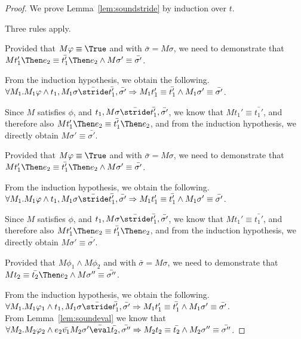 \begin{proof}
  We prove Lemma~\ref{lem:soundstride} by induction over $t$.

  {
  Three rules apply.\\
    {Provided that $M\phi\equiv\True$ and  with $\bar{\sigma}=M\sigma$,
    we need to demonstrate that $M t_1'\Then e_2 \equiv \bar{t_1'}\Then e_2 \land M\sigma'\equiv \bar{\sigma'}$.

    From the induction hypothesis, we obtain the following.\\
    $\forall M_1 . M_1 \phi \land t_1,M_1\sigma \bar{\stride} \bar{t_1'},\bar{\sigma'}\implies M_1 t_1'\equiv\bar{t_1'}\land M_1\sigma' \equiv \bar{\sigma'}$.

    Since $M$ satisfies $\phi$, and $t_1,M\sigma \bar{\stride} \bar{t_1'},\bar{\sigma'}$,
    we know that $M t_1'\equiv\bar{t_1'}$,
    and therefore also $M t_1'\Then e_2 \equiv \bar{t_1'}\Then e_2$,
    and from the induction hypothesis, we directly obtain  $M\sigma'\equiv \bar{\sigma'}$.
    }
    {Provided that $M\phi\equiv\True$ and  with $\bar{\sigma}=M\sigma$,
    we need to demonstrate that $M t_1'\Then e_2 \equiv \bar{t_1'}\Then e_2 \land M\sigma'\equiv \bar{\sigma'}$.

    From the induction hypothesis, we obtain the following.\\
    $\forall M_1 . M_1 \phi \land t_1,M_1\sigma \bar{\stride} \bar{t_1'},\bar{\sigma'}\implies M_1 t_1'\equiv\bar{t_1'}\land M_1\sigma' \equiv \bar{\sigma'}$.

    Since $M$ satisfies $\phi$, and $t_1,M\sigma \bar{\stride} \bar{t_1'},\bar{\sigma'}$,
    we know that $M t_1'\equiv\bar{t_1'}$,
    and therefore also $M t_1'\Then e_2 \equiv \bar{t_1'}\Then e_2$,
    and from the induction hypothesis, we directly obtain  $M\sigma'\equiv \bar{\sigma'}$.
    }
    {Provided that $M\phi_1\land M\phi_2$ and  with $\bar{\sigma}=M\sigma$,
    we need to demonstrate that $M t_2 \equiv \bar{t_2}\Then e_2 \land M\sigma''\equiv \bar{\sigma''}$.

    From the induction hypothesis, we obtain the following.\\
    $\forall M_1 . M_1 \phi_1 \land t_1,M_1\sigma \bar{\stride} \bar{t_1'},\bar{\sigma'}\implies M_1 t_1'\equiv\bar{t_1'}\land M_1\sigma' \equiv \bar{\sigma'}$.\\
    From Lemma~\ref{lem:soundeval} we know that\\
    $\forall M_2 . M_2 \phi_2 \land e_2\bar{v_1}M_2\sigma'\bar{\eval}\bar{t_2},\bar{\sigma''}\implies M_2 t_2\equiv \bar{t_2}\land M_2\sigma''\equiv \bar{\sigma''}$.

}}
\end{proof}
